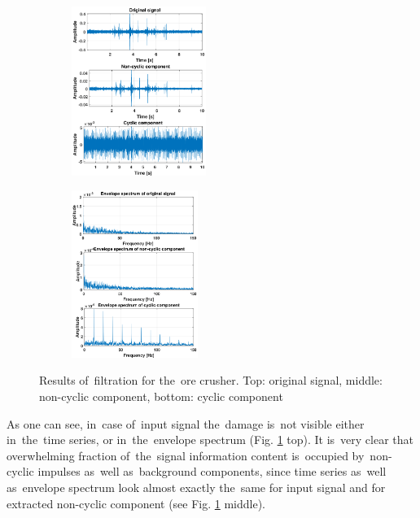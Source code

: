 \begin{figure}[!ht]
 \centering
 \begin{subfigure}
   \centering
   \includegraphics[width=0.48\textwidth]{wykresy/nmfb_out}
 \end{subfigure}
 \begin{subfigure}
   \centering
		\includegraphics[width=0.45\textwidth]{wykresy/nmfb_widma}
 \end{subfigure}
 \caption{Results of~filtration for the~ore crusher. Top: original signal, middle: non-cyclic component, bottom: cyclic component}
 \label{fig: nmfb_out}
\end{figure}

As one can see, in~case of~input signal the~damage is~not visible either in~the~time series, or in~the~envelope spectrum (Fig. \ref{fig: nmfb_out} top). It is~very clear that overwhelming fraction of~the~signal information content is~occupied by~non-cyclic impulses as~well as~background components, since time series as~well as~envelope spectrum look almost exactly the~same for input signal and for extracted non-cyclic component (see Fig. \ref{fig: nmfb_out} middle).

